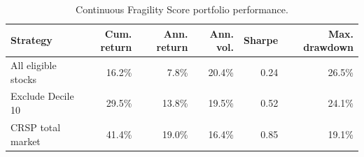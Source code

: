 \begin{table}[!htbp]
\centering
\footnotesize
\caption{Continuous Fragility Score portfolio performance.}
\label{tab:portfolio-performance}
\begin{tabular}{lrrrrr}
\toprule
Strategy & Cum. return & Ann. return & Ann. vol. & Sharpe & Max. drawdown \\
\midrule
All eligible stocks & 16.2\% & 7.8\% & 20.4\% & 0.24 & 26.5\% \\
Exclude Decile 10 & 29.5\% & 13.8\% & 19.5\% & 0.52 & 24.1\% \\
CRSP total market & 41.4\% & 19.0\% & 16.4\% & 0.85 & 19.1\% \\
\bottomrule
\end{tabular}
\end{table}
